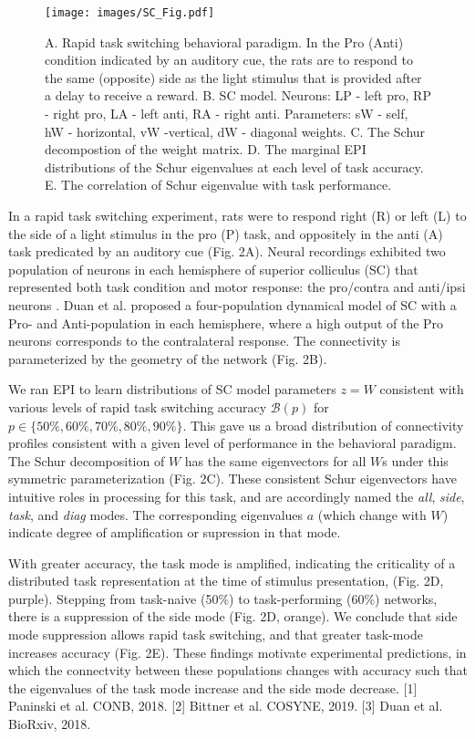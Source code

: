 \documentclass[12pt]{article}
\begin{document}
\begin{wrapfigure}{t}{.68\textwidth}
\vspace{0.2cm}
\texttt{[image: images/SC\_Fig.pdf]}
\caption{A. Rapid task switching behavioral paradigm. In the Pro (Anti) condition indicated by an auditory cue, the rats are to respond to the same (opposite) side as the light stimulus that is provided after a delay to receive a reward. B. SC model. Neurons: LP - left pro, RP - right pro, LA - left anti, RA - right anti.  Parameters: sW - self, hW - horizontal, vW -vertical, dW - diagonal weights. C. The Schur decompostion of the weight matrix. D. The marginal EPI distributions of the Schur eigenvalues at each level of task accuracy. E. The correlation of Schur eigenvalue with task performance.}
\vspace{0.5cm}
\end{wrapfigure}
\hspace{0.4cm} In a rapid task switching experiment, rats were to respond right (R) or left (L) to the side of a light stimulus in the pro (P) task, and oppositely in the anti (A) task predicated by an auditory cue (Fig. 2A). Neural recordings exhibited two population of neurons in each hemisphere of superior colliculus (SC) that  represented both task condition and motor response: the pro/contra and anti/ipsi neurons \cite{duan2018collicular}.  Duan et al. proposed a four-population dynamical model of SC with a Pro- and Anti-population in each hemisphere, where a high output of the Pro neurons corresponds to the  contralateral response. The connectivity is parameterized by the geometry of the network (Fig. 2B).

 We ran EPI to learn distributions of SC model parameters $z = W$ consistent with various levels of rapid task switching accuracy $\mathcal{B}(p)$ for $p \in \{50\%, 60\%, 70\%, 80\%, 90\%\}$.  This gave us a broad distribution of connectivity profiles consistent with a given level of performance in the behavioral paradigm.  The Schur decomposition of $W$ has the same eigenvectors for all $W$s under this symmetric parameterization (Fig. 2C).
These consistent Schur eigenvectors have intuitive roles in processing for this task, and are accordingly named the \textit{all}, \textit{side}, \textit{task}, and \textit{diag} modes. The corresponding eigenvalues $a$ (which change with $W$) indicate degree of  amplification or supression in that mode. 

With greater accuracy, the task mode is amplified, indicating the criticality of a distributed task representation at the time of stimulus presentation, (Fig. 2D, purple).  Stepping from task-naive (50\%) to task-performing (60\%) networks, there is a suppression of the side mode (Fig. 2D, orange).  We conclude that side mode suppression allows rapid task switching, and that greater task-mode increases accuracy (Fig. 2E).  These findings motivate experimental predictions, in which the connectvity between these populations changes with accuracy such that the eigenvalues of the task mode increase  and the side mode decrease.   [1] Paninski et al. CONB, 2018. [2] Bittner et al. COSYNE, 2019. [3] Duan et al. BioRxiv, 2018.



\end{document}
